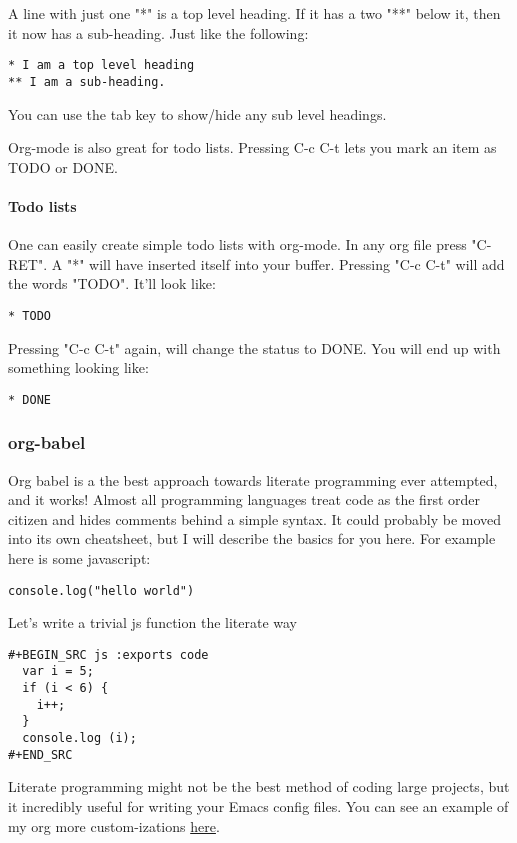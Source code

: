\documentclass[11pt]{article}
\begin{document}
A line with just one "*" is a top level heading.  If it has a two "**" below it, then it now has a sub-heading.  Just like the following:
\begin{verbatim}
* I am a top level heading
** I am a sub-heading.
\end{verbatim}

You can use the tab key to show/hide any sub level headings.


Org-mode is also great for todo lists.  Pressing C-c C-t lets you mark an item as TODO or DONE.
\paragraph{Todo lists}
\label{sec:orgheadline14}
One can easily create simple todo lists with org-mode.  In any org file press "C-RET".  A "*" will have inserted itself into your buffer.  Pressing "C-c C-t" will add the words "TODO".  It'll look like:

\begin{verbatim}
* TODO
\end{verbatim}

Pressing "C-c C-t" again, will change the status to DONE.  You will end up with something looking like:

\begin{verbatim}
* DONE
\end{verbatim}

\subsubsection{org-babel}
\label{sec:orgheadline17}
Org babel is a the best approach towards literate programming ever attempted, and it works!  Almost all programming languages treat code as the first order citizen and hides comments behind a simple syntax.  It could probably be moved into its own cheatsheet, but I will describe the basics for you here.  For example here is some javascript:

\begin{verbatim}
console.log("hello world")
\end{verbatim}

Let's write a trivial js function the literate way

\begin{verbatim}
#+BEGIN_SRC js :exports code
  var i = 5;
  if (i < 6) {
    i++;
  }
  console.log (i);
#+END_SRC
\end{verbatim}

Literate programming might not be the best method of coding large projects, but it incredibly useful for writing your Emacs config files.  You can see an example of my org more custom-izations \href{https://github.com/jbranso/.emacs.d/blob/master/lisp/init-org.org}{here}.
\end{document}
